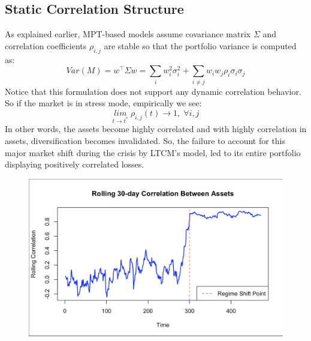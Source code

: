 \documentclass[11pt]{article}
\begin{document}
    \subsection{Static Correlation Structure}
    As explained earlier, MPT-based models assume covariance matrix $\Sigma$ and correlation coefficients $\rho_{i,j}$ are stable so that the portfolio variance is computed as:
    \begin{equation}
        Var(M) = w^\intercal\Sigma w = \sum_i w_i^2\sigma_i^2 + \sum_{i\ne j}w_iw_j\rho_i\sigma_i\sigma_j
    \end{equation}
    Notice that this formulation does not support any dynamic correlation behavior. So if the market is in stress mode, empirically we see:
    \begin{equation}
        \underset{t\rightarrow t^*}{lim} \; \rho_{i,j}(t) \rightarrow 1, \;\forall i,j
    \end{equation}
    In other words, the assets become highly correlated and with highly correlation in assets, diversification becomes invalidated. So, the failure to account for this major market shift during the crisis by LTCM's model, led to its entire portfolio displaying positively correlated losses.

    \begin{figure}[H]
        \centering
        \begin{minipage}{0.6\textwidth}
            \includegraphics[width=\linewidth]{Graphs_Chris/rolling_corr.png}
        \end{minipage}%
        \hfill
        \begin{minipage}{0.35\textwidth}
            \label{fig:rolling_corr}
        \end{minipage}
    \end{figure}
\end{document}
